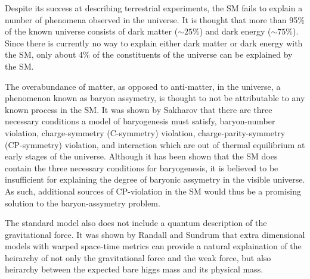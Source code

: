 Despite its success at describing terrestrial experiments, the SM fails 
to explain a number of phenomena observed in the universe.  
It is thought that more than 95\% of the known universe consists of dark 
matter ($\sim25$\%) and dark energy ($\sim75$\%)\cite{??}.  Since there is 
currently no way to explain either dark matter or dark energy with the SM, 
only about 4\% of the constituents of the universe can be explained by the 
SM.  

The overabundance of matter, as opposed to anti-matter, in the 
universe, a phenomenon known as baryon assymetry, is thought to not be 
attributable to any known process in the SM.
It was shown by Sakharov\cite{??} that there are three necessary conditions 
a model of baryogenesis must satisfy, baryon-number violation, 
charge-symmetry (C-symmetry) violation, charge-parity-symmetry (CP-symmetry)
violation, and interaction which are out of thermal equilibrium at early
stages of the universe.  Although it has been shown that the SM does
contain the three necessary conditions for baryogenesis, it is believed
to be insufficient for explaining the degree of baryonic assymetry in the 
visible universe.  As such, additional sources of CP-violation in the SM would 
thus be a promising solution to the baryon-assymetry problem.  

The standard model also does not include a quantum description of the 
gravitational force.  It was shown by Randall and Sundrum that extra dimensional
models with warped space-time metrics can provide a natural explaination of the
heirarchy of not only the gravitational force and the weak force, but also
heirarchy between the expected bare higgs mass and its physical mass.  


